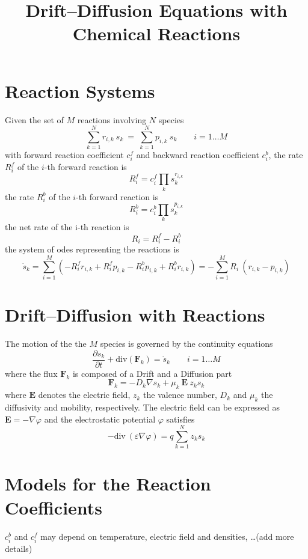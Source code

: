 \documentclass[11pt]{amsart}
\title{Drift--Diffusion Equations with Chemical Reactions}
\author{}
\begin{document}
\maketitle

\section{Reaction Systems}

Given the set of $M$ reactions involving $N$ species
\[
\sum_{k=1}^{N} r_{i,k}\ s_k\ =\ \sum_{k=1}^{N} p_{i,k}\ s_k \qquad  i=1\ldots M
\]
with forward reaction coefficient $c^f_i$ and backward reaction coefficient $c^b_i$,
the rate $R^{f}_i$ of the $i$-th forward reaction is 
$$
 R^{f}_i = c^{f}_i \prod_k s_k^{ r_{i,k} }
$$
the rate $R^{b}_i$ of the $i$-th forward reaction is 
$$
 R^{b}_i = c^{b}_i \prod_k s_k^{ p_{i,k} }
$$
the net rate of the i-th reaction is 
$$
R_i = R^{f}_i - R^{b}_i
$$
the system of odes representing the reactions is
$$
\dot{s}_k = \sum_{i=1}^M \left( - R^{f}_i r_{i,k} + R^{f}_i p_{i,k}
             - R^{b}_i p_{i,k} + R^{b}_i r_{i,k} \right) =
             - \sum_{i=1}^M  R_i\ (r_{i,k} - p_{i,k}) 
$$

\section{Drift--Diffusion with Reactions}

The motion of the the $M$ species is governed by the continuity equations
$$
\dfrac{\partial s_{k}}{\partial t} + \mathrm{div} \left( \mathbf{F}_{k} \right) = \dot{s}_k  \qquad  i=1\ldots M
$$
where the flux $\mathbf{F}_{k}$ is composed of a Drift and a Diffusion part
$$
\mathbf{F}_{k} = - D_{k} \nabla s_{k} + \mu_{k}\ \mathbf{E}\ z_{k} s_{k}
$$
where $\mathbf{E}$ denotes the electric field, $z_{k}$ the valence number, $D_{k}$ and $\mu_{k}$ 
the diffusivity and mobility, respectively.
The electric field can be expressed as $\mathbf{E} = - \nabla \varphi$ and the electrostatic potential $\varphi$ 
satisfies
$$
-\mathrm{div}\ \left( \varepsilon \nabla \varphi \right) = q \sum_{k=1}^{N} z_{k} s_{k}
$$

\section{Models for the Reaction Coefficients}

$c^{b}_i$ and $c^{f}_i$ may depend on temperature, electric field and densities, \dots(add more details) 
\end{document}
